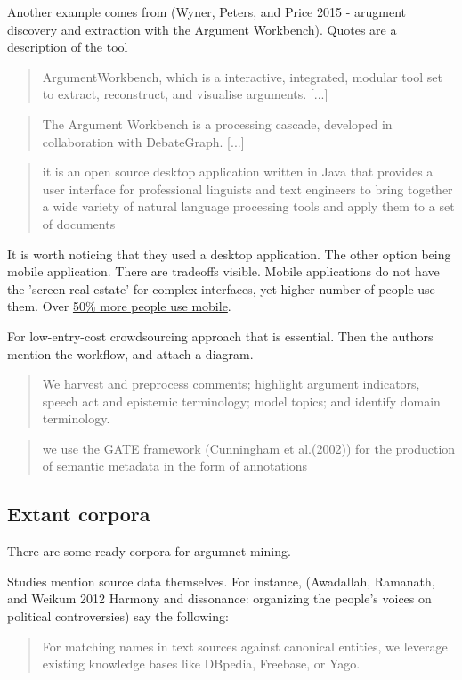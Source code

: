 \documentclass{article}
\begin{document}
Another example comes from (Wyner, Peters, and Price 2015 - arugment discovery and extraction with the Argument Workbench).
Quotes are a description of the tool
\begin{quote}
 ArgumentWorkbench, which is a interactive, integrated, modular tool set to extract, reconstruct, and visualise arguments. [...]
\end{quote}
\begin{quote}
 The Argument Workbench is a processing cascade, developed in collaboration with DebateGraph. [...]
\end{quote}
\begin{quote}
 it is an open source desktop application written in Java that provides a user interface for professional linguists and text engineers to bring together a wide variety of natural language processing tools and apply them to a set of documents
\end{quote}

It is worth noticing that they used a desktop application. The other option being mobile application. There are tradeoffs visible.
Mobile applications do not have the 'screen real estate' for complex interfaces, yet higher number of people use them. Over \href{https://gs.statcounter.com/platform-market-share/desktop-mobile-tablet}{50\% more people use mobile}.

For low-entry-cost crowdsourcing approach that is essential.
Then the authors mention the workflow, and attach a diagram.
\begin{quote}
 We harvest and preprocess comments; highlight argument indicators, speech act and epistemic terminology; model topics; and identify domain terminology.
\end{quote}
\begin{quote}
 we use the GATE framework (Cunningham et al.(2002)) for the production of semantic metadata in the form of annotations
\end{quote}

\subsection{Extant corpora}
There are some ready corpora for argumnet mining.

Studies mention source data themselves. 
For instance, (Awadallah, Ramanath, and Weikum 2012 Harmony and dissonance: organizing the people's voices on political controversies)
say the following:
\begin{quote}
 For matching names in text sources against canonical entities, we leverage existing knowledge bases like DBpedia, Freebase, or Yago.
\end{quote}
\end{document}
